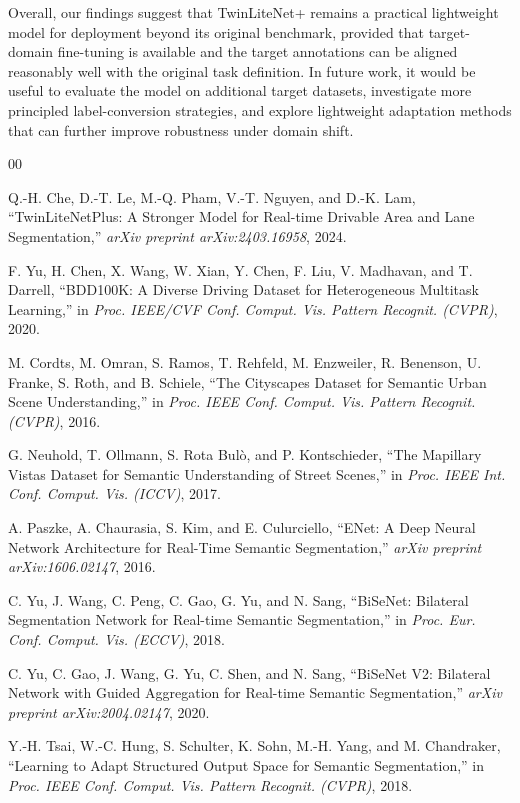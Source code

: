 \documentclass[conference]{IEEEtran}
\begin{document}
Overall, our findings suggest that TwinLiteNet+ remains a practical lightweight model for deployment beyond its original benchmark, provided that target-domain fine-tuning is available and the target annotations can be aligned reasonably well with the original task definition. In future work, it would be useful to evaluate the model on additional target datasets, investigate more principled label-conversion strategies, and explore lightweight adaptation methods that can further improve robustness under domain shift.

\newpage
\begin{thebibliography}{00}

Q.-H. Che, D.-T. Le, M.-Q. Pham, V.-T. Nguyen, and D.-K. Lam,
``TwinLiteNetPlus: A Stronger Model for Real-time Drivable Area and Lane Segmentation,''
\textit{arXiv preprint arXiv:2403.16958}, 2024.

F. Yu, H. Chen, X. Wang, W. Xian, Y. Chen, F. Liu, V. Madhavan, and T. Darrell,
``BDD100K: A Diverse Driving Dataset for Heterogeneous Multitask Learning,''
in \textit{Proc. IEEE/CVF Conf. Comput. Vis. Pattern Recognit. (CVPR)}, 2020.

M. Cordts, M. Omran, S. Ramos, T. Rehfeld, M. Enzweiler, R. Benenson, U. Franke, S. Roth, and B. Schiele,
``The Cityscapes Dataset for Semantic Urban Scene Understanding,''
in \textit{Proc. IEEE Conf. Comput. Vis. Pattern Recognit. (CVPR)}, 2016.

G. Neuhold, T. Ollmann, S. Rota Bul\`o, and P. Kontschieder,
``The Mapillary Vistas Dataset for Semantic Understanding of Street Scenes,''
in \textit{Proc. IEEE Int. Conf. Comput. Vis. (ICCV)}, 2017.

A. Paszke, A. Chaurasia, S. Kim, and E. Culurciello,
``ENet: A Deep Neural Network Architecture for Real-Time Semantic Segmentation,''
\textit{arXiv preprint arXiv:1606.02147}, 2016.

C. Yu, J. Wang, C. Peng, C. Gao, G. Yu, and N. Sang,
``BiSeNet: Bilateral Segmentation Network for Real-time Semantic Segmentation,''
in \textit{Proc. Eur. Conf. Comput. Vis. (ECCV)}, 2018.

C. Yu, C. Gao, J. Wang, G. Yu, C. Shen, and N. Sang,
``BiSeNet V2: Bilateral Network with Guided Aggregation for Real-time Semantic Segmentation,''
\textit{arXiv preprint arXiv:2004.02147}, 2020.

Y.-H. Tsai, W.-C. Hung, S. Schulter, K. Sohn, M.-H. Yang, and M. Chandraker,
``Learning to Adapt Structured Output Space for Semantic Segmentation,''
in \textit{Proc. IEEE Conf. Comput. Vis. Pattern Recognit. (CVPR)}, 2018.


\end{thebibliography}
\end{document}

